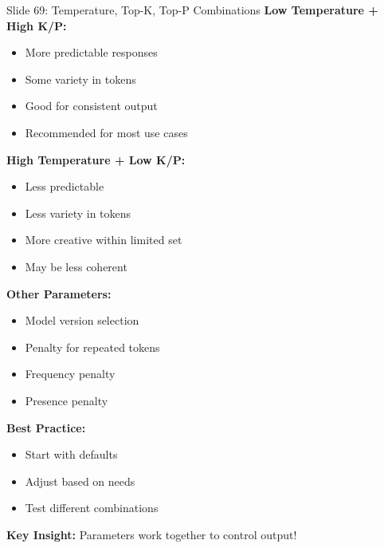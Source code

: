 \documentclass[8pt]{beamer}
\begin{document}
	\begin{frame}{Slide 69: Temperature, Top-K, Top-P Combinations}
		\fontsize{6.5}{7.5}\selectfont
		\textbf{Low Temperature + High K/P:}
		\begin{itemize}
			\item More predictable responses
			\item Some variety in tokens
			\item Good for consistent output
			\item Recommended for most use cases
		\end{itemize}
		
		\vspace{0.1cm}
		\textbf{High Temperature + Low K/P:}
		\begin{itemize}
			\item Less predictable
			\item Less variety in tokens
			\item More creative within limited set
			\item May be less coherent
		\end{itemize}
		
		\vspace{0.1cm}
		\textbf{Other Parameters:}
		\begin{itemize}
			\item Model version selection
			\item Penalty for repeated tokens
			\item Frequency penalty
			\item Presence penalty
		\end{itemize}
		
		\vspace{0.1cm}
		\textbf{Best Practice:}
		\begin{itemize}
			\item Start with defaults
			\item Adjust based on needs
			\item Test different combinations
		\end{itemize}
		
		\textcolor{myblue}{\textbf{Key Insight:}} Parameters work together to control output!
	\end{frame}
	
\end{document}
